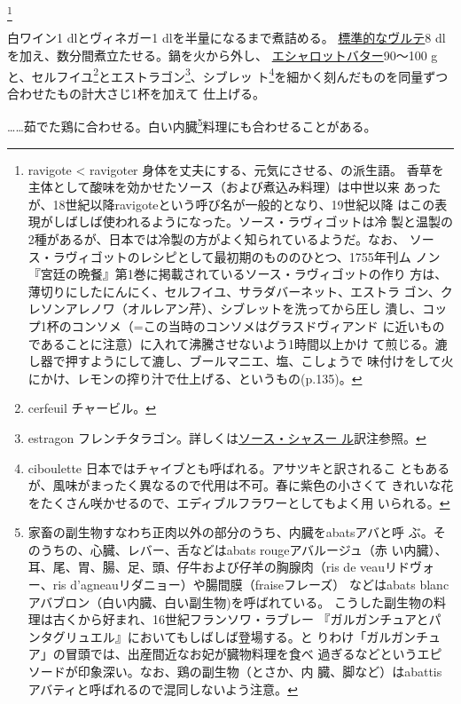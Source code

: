 \begin{recette}
\footnote{ravigote \textless{} ravigoter
  身体を丈夫にする、元気にさせる、の派生語。
  香草を主体として酸味を効かせたソース（および煮込み料理）は中世以来
  あったが、18世紀以降ravigoteという呼び名が一般的となり、19世紀以降
  はこの表現がしばしば使われるようになった。ソース・ラヴィゴットは冷
  製と温製の2種があるが、日本では冷製の方がよく知られているようだ。なお、
  ソース・ラヴィゴットのレシピとして最初期のもののひとつ、1755年刊ム
  ノン『宮廷の晩餐』第1巻に掲載されているソース・ラヴィゴットの作り
  方は、薄切りにしたにんにく、セルフイユ、サラダバーネット、エストラ
  ゴン、クレソンアレノワ（オルレアン芹）、シブレットを洗ってから圧し
  潰し、コップ1杯のコンソメ（=この当時のコンソメはグラスドヴィアンド
  に近いものであることに注意）に入れて沸騰させないよう1時間以上かけ
  て煎じる。漉し器で押すようにして漉し、ブールマニエ、塩、こしょうで
  味付けをして火にかけ、レモンの搾り汁で仕上げる、というもの(p.135)。}


白ワイン1\undemi{} dlとヴィネガー1\undemi{} dlを半量になるまで煮詰める。
\protect\hyperlink{veloute}{標準的なヴルテ}8
dlを加え、数分間煮立たせる。鍋を火から外し、
\protect\hyperlink{beurre-d-echalote}{エシャロットバター}90〜100
gと、セルフイユ\footnote{cerfeuil チャービル。}とエストラゴン\footnote{estragon
  フレンチタラゴン。詳しくは\protect\hyperlink{sauce-chasseur}{ソース・シャスー
  ル}訳注参照。}、シブレッ ト\footnote{ciboulette
  日本ではチャイブとも呼ばれる。アサツキと訳されるこ
  ともあるが、風味がまったく異なるので代用は不可。春に紫色の小さくて
  きれいな花をたくさん咲かせるので、エディブルフラワーとしてもよく用
  いられる。}を細かく刻んだものを同量ずつ合わせたもの計大さじ1\undemi{}杯を加えて
仕上げる。

\ldots{}\ldots{}茹でた鶏に合わせる。白い内臓\footnote{家畜の副生物すなわち正肉以外の部分のうち、内臓をabatsアバと呼
  ぶ。そのうちの、心臓、レバー、舌などはabats rougeアバルージュ（赤
  い内臓）、耳、尾、胃、腸、足、頭、仔牛および仔羊の胸腺肉（ris de
  veauリドヴォー、ris d'agneauリダニョー）や腸間膜（fraiseフレーズ）
  などはabats blancアバブロン（白い内臓、白い副生物)を呼ばれている。
  こうした副生物の料理は古くから好まれ、16世紀フランソワ・ラブレー
  『ガルガンチュアとパンタグリュエル』においてもしばしば登場する。と
  りわけ「ガルガンチュア」の冒頭では、出産間近なお妃が臓物料理を食べ
  過ぎるなどというエピソードが印象深い。なお、鶏の副生物（とさか、内
  臓、脚など）はabattisアバティと呼ばれるので混同しないよう注意。}料理にも合わせることがある。


\end{recette}
